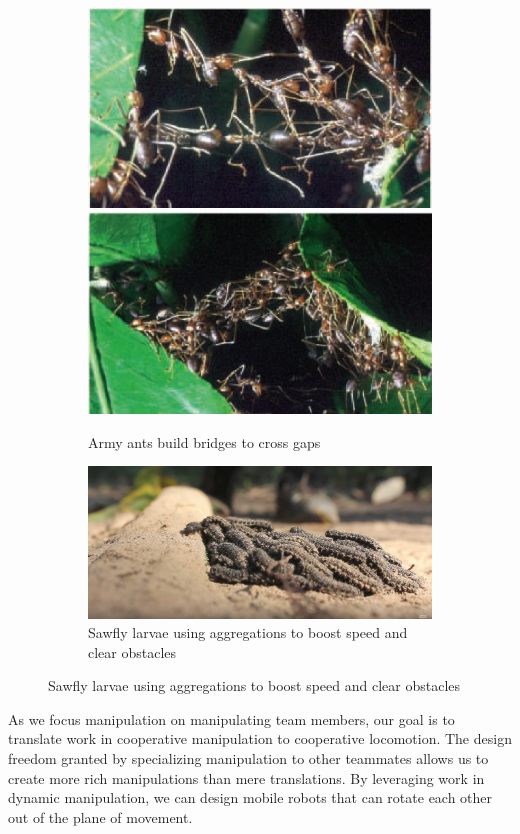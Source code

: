 \documentclass[letterpaper]{report}
\begin{document}
\begin{figure}[ht]
  \centering
  \begin{subfigure}[t]{0.8\textwidth}
    \centering
    \includegraphics[width=.5\linewidth,height=.3\textwidth]{AndersonAntBridgeL.png}%
    \includegraphics[width=.5\linewidth,height=.3\textwidth]{AndersonAntBridgeM.png}\\
    \caption{Army ants build bridges to cross gaps \cite{Anderson2002}}
  \end{subfigure}

  \begin{subfigure}[t]{0.8\textwidth}
    \centering
    \includegraphics[width=\linewidth]{SawflyLarvaeClimb.png}
    \caption{Sawfly larvae using aggregations to boost speed and clear obstacles \cite{SEDSawflyCluster}}
  \end{subfigure}
\end{figure}

As we focus manipulation on manipulating team members, our goal is to translate work in cooperative manipulation to cooperative locomotion.
The design freedom granted by specializing manipulation to other teammates allows us to create more rich manipulations than mere translations.
By leveraging work in dynamic manipulation, we can design mobile robots that can rotate each other out of the plane of movement.
\end{document}
